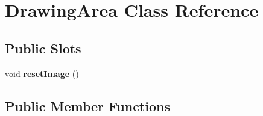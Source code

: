 \hypertarget{class_drawing_area}{
\section{DrawingArea Class Reference}
\label{class_drawing_area}
}
\subsection*{Public Slots}
\begin{DoxyCompactItemize}
\item 
\hypertarget{class_drawing_area_ace63549a43879c57d0bbb5fbc3e8a247}{
void {\bfseries resetImage} ()}
\label{class_drawing_area_ace63549a43879c57d0bbb5fbc3e8a247}

\end{DoxyCompactItemize}
\subsection*{Public Member Functions}
